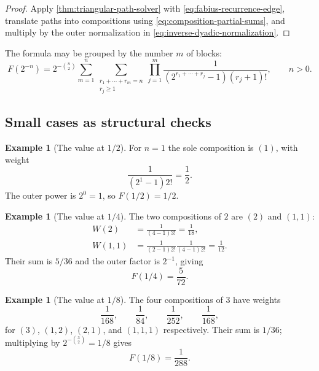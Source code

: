 \documentclass[11pt,oneside]{article}
\theoremstyle{definition}
\newtheorem{example}[theorem]{Example}
\theoremstyle{remark}
\begin{document}
\begin{proof}
Apply \cref{thm:triangular-path-solver} with \eqref{eq:fabius-recurrence-edge}, translate
paths into compositions using \eqref{eq:composition-partial-sums}, and multiply by the outer
normalization in \eqref{eq:inverse-dyadic-normalization}.
\end{proof}

The formula may be grouped by the number $m$ of blocks:
\begin{equation}
 F(2^{-n})=
 2^{-\binom n2}
 \sum_{m=1}^{n}
 \sum_{\substack{r_1+\cdots+r_m=n\\r_j\ge1}}
 \prod_{j=1}^{m}
 \frac{1}{(2^{r_1+\cdots+r_j}-1)(r_j+1)!},
 \qquad n>0.
 \label{eq:composition-by-length}
\end{equation}

\subsection{Small cases as structural checks}

\begin{example}[The value at $1/2$]
For $n=1$ the sole composition is $(1)$, with weight
\[
 \frac1{(2^1-1)2!}=\frac12.
\]
The outer power is $2^0=1$, so $F(1/2)=1/2$.
\end{example}

\begin{example}[The value at $1/4$]
The two compositions of $2$ are $(2)$ and $(1,1)$:
\begin{align*}
 W(2)&=\frac1{(4-1)3!}=\frac1{18},\\
 W(1,1)&=\frac1{(2-1)2!}\frac1{(4-1)2!}=\frac1{12}.
\end{align*}
Their sum is $5/36$ and the outer factor is $2^{-1}$, giving
\begin{equation}
 F(1/4)=\frac5{72}.
 \label{eq:F-quarter-path-check}
\end{equation}
\end{example}

\begin{example}[The value at $1/8$]
The four compositions of $3$ have weights
\begin{equation*}
 \frac1{168},\qquad
 \frac1{84},\qquad
 \frac1{252},\qquad
 \frac1{168},
\end{equation*}
for $(3)$, $(1,2)$, $(2,1)$, and $(1,1,1)$ respectively.  Their sum is $1/36$; multiplying by
$2^{-\binom32}=1/8$ gives
\begin{equation}
 F(1/8)=\frac1{288}.
 \label{eq:F-eighth-path-check}
\end{equation}
\end{example}
\end{document}
